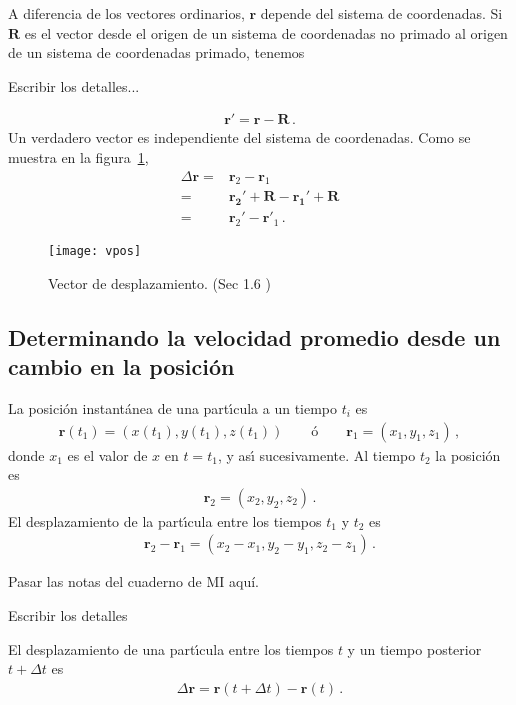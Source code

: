 A diferencia de los vectores ordinarios, $\mathbf{r}$ depende del sistema de coordenadas. Si $\mathbf{R}$ es el vector desde el origen de un sistema de coordenadas no primado al origen de un sistema de coordenadas primado, tenemos
\begin{inprogress}
  Escribir los detalles...
\end{inprogress}
\begin{align}
  \mathbf{r}'=\mathbf{r}-\mathbf{R}\,.
\end{align}
Un verdadero  vector es independiente del sistema de coordenadas. Como se muestra en la figura~\ref{fig:vpos},
\begin{align}
  \Delta\mathbf{r}=&\mathbf{r}_2-\mathbf{r}_1\nonumber\\
  =&\mathbf{\mathbf{r}_2'+\mathbf{R}}
-\mathbf{\mathbf{r}_1'+\mathbf{R}}\nonumber\\
=&\mathbf{r}_2'-\mathbf{r}'_1\,.
\end{align}
\begin{frame}[plain]
  \begin{figure}
  \centering
  \texttt{[image: vpos]}
  \caption{Vector de desplazamiento. (Sec 1.6 \cite{Kleppner})}
  \label{fig:vpos}
\end{figure}
\end{frame}

\subsection{Determinando la velocidad promedio desde un cambio en la posición}
La posici\'on instant\'anea de una part\'\i cula a un tiempo $t_i$ es
\begin{align}
  \mathbf{r}(t_1)=(x(t_1),y(t_1),z(t_1))\qquad \text{\'o}\qquad
  \mathbf{r}_1=(x_1,y_1,z_1)\,,
\end{align}
donde $x_1$ es el valor de $x$ en $t=t_1$, y as\'\i{} sucesivamente. Al tiempo $t_2$ la posici\'on es
\begin{align}
  \mathbf{r}_2=(x_2,y_2,z_2)\,.
\end{align}
El desplazamiento de la part\'\i cula entre los tiempos $t_1$ y $t_2$ es
\begin{align}
  \mathbf{r}_2-\mathbf{r}_1=(x_2-x_1,y_2-y_1,z_2-z_1)\,.
\end{align}



\begin{inprogress}
Pasar las notas del cuaderno de MI aquí.

Escribir los detalles %
\end{inprogress}
El desplazamiento de una part\'\i cula entre los tiempos $t$ y un tiempo posterior $t+\Delta t$ es
\begin{align}
  \Delta\mathbf{r}=\mathbf{r}(t+\Delta t)-\mathbf{r}(t)\,.
\end{align}


